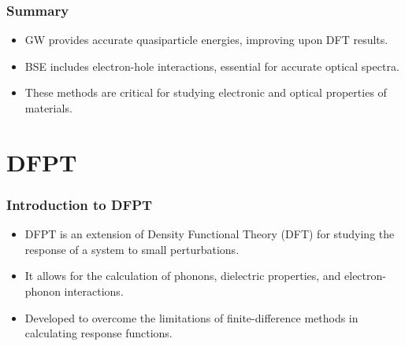 \documentclass{CustomBeamer}
\begin{document}
        \begin{frame}
        \frametitle{Summary}
        \begin{itemize}
            \item GW provides accurate quasiparticle energies, improving upon DFT results.
            \item BSE includes electron-hole interactions, essential for accurate optical spectra.
            \item These methods are critical for studying electronic and optical properties of materials.
        \end{itemize}
        \end{frame}
        
    

    


\section{DFPT}
\begin{frame}
    \frametitle{Introduction to DFPT}
    \begin{itemize}
        \item DFPT is an extension of Density Functional Theory (DFT) for studying the response of a system to small perturbations.
        \item It allows for the calculation of phonons, dielectric properties, and electron-phonon interactions.
        \item Developed to overcome the limitations of finite-difference methods in calculating response functions.
    \end{itemize}
    \end{frame}
    
\end{document}
